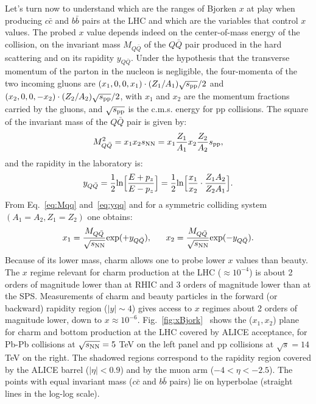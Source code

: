 Let's turn now to understand which are the ranges of Bjorken $x$
at play when producing $c\bar{c}$ and $b\bar{b}$ pairs at the LHC and which are the
variables that control $x$ values. The probed $x$ value depends indeed on the center-of-mass energy
of the collision, on the invariant mass $M_{Q\bar{Q}}$ of the $Q\bar{Q}$ pair produced in the hard scattering
and on its rapidity $y_{Q\bar{Q}}$. Under the hypothesis that the transverse momentum of the parton 
in the nucleon is negligible, the four-momenta of the two incoming gluons are $(x_1,0,0,x_1)\cdot(Z_1/A_1)\sqrt{s_{\rm pp}}/2$
and $(x_2,0,0,-x_2)\cdot(Z_2/A_2)\sqrt{s_{\rm pp}}/2$, with $x_1$ and $x_2$ are the momentum fractions 
carried by the gluons, and $\sqrt{s_{\rm pp}}$ is the c.m.s. energy for pp collisions. 
The square of the invariant mass of the $Q\bar{Q}$ pair is given by:
\begin{equation}
\label{eq:Mqq}
M_{Q\bar{Q}}^2 =  x_1 x_2 s_{\rm NN} = x_1 \frac{Z_1}{A_1} x_2 \frac{Z_2}{A_2} s_{\rm pp},
\end{equation}
and the rapidity in the laboratory is:
\begin{equation}
\label{eq:yqq}
y_{Q\bar{Q}} = \frac{1}{2} {\rm ln} {\Big [ } \frac{E +p_z}{E-p_z}  {\Big ] }= \frac{1}{2} {\rm ln} {\Big [ } \frac{x_1}{x_2} \cdot \frac{Z_1 A_2}{Z_2 A_1} {\Big ] }.    
\end{equation}
From Eq.~\ref{eq:Mqq} and~\ref{eq:yqq} and for a symmetric colliding system $(A_1 = A_2, Z_1 = Z_2)$
one obtains:
\begin{equation}
\label{eq:x1x2}
x_1 = \frac{M_{Q\bar{Q}}}{\sqrt{s_{\rm NN}}} {\rm exp} (+y_{Q\bar{Q}} ), \; \; \; \; \; \;
x_2 = \frac{M_{Q\bar{Q}}}{\sqrt{s_{\rm NN}}} {\rm exp} (-y_{Q\bar{Q}} ). 
\end{equation}
Because of its lower mass, charm allows one to probe lower $x$ values than beauty. 
The $x$ regime relevant for charm production at the LHC ($\approx 10^{-4}$) is about 
2 orders of magnitude lower than at RHIC and 3 orders of magnitude lower than at the SPS.
Measurements of charm and beauty particles in the forward (or backward) rapidity region ($|y| \sim 4 $) 
gives access to $x$ regimes about 2 orders of magnitude lower, down to $x \approx 10^{-6}$.
Fig.~\ref{fig:xBjork}~\cite{Alessandro:2006yt} shows the ($x_1, x_2$) plane for charm and bottom production at the LHC
covered by ALICE acceptance, for Pb-Pb
collisions at $\sqrt{s_{\rm NN}} = 5$ TeV on the left panel and pp collisions at $\sqrt{s} = 14$ TeV on the right.
The shadowed regions correspond to the rapidity region covered by the ALICE barrel ($|\eta| < 0.9$) and by the 
muon arm ($-4 < \eta < -2.5$).
The points with equal invariant mass ($c\bar{c}$ and $b\bar{b}$ pairs) lie on hyperbolae (straight lines in the log-log scale).\\


